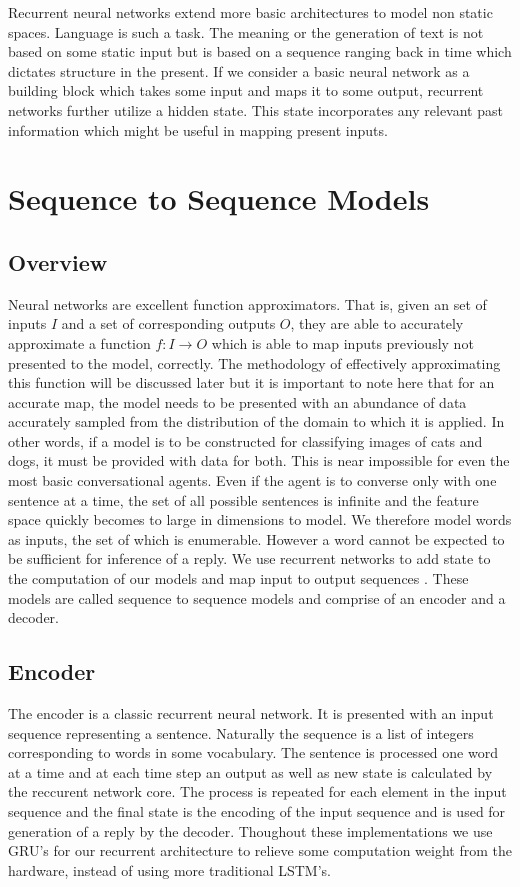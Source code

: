 \documentclass{article}
\begin{document}
    \noindent Recurrent neural networks extend more basic architectures to model non static spaces. Language is such a task. The meaning or the generation of text is not based on some static input but is based on a sequence ranging back in time which dictates structure in the present. If we consider a basic neural network as a building block which takes some input and maps it to some output, recurrent networks further utilize a hidden state. This state incorporates any relevant past information which might be useful in mapping present inputs\cite{rnns}.
    
\section{Sequence to Sequence Models}

\subsection{Overview}
Neural networks are excellent function approximators. That is, given an set of inputs $I$ and a set of corresponding outputs $O$, they are able to accurately approximate a function $f: I \rightarrow O$ which is able to map inputs previously not presented to the model, correctly. The methodology of effectively approximating this function will be discussed later but it is important to note here that for an accurate map, the model needs to be presented with an abundance of data accurately sampled from the distribution of the domain to which it is applied. In other words, if a model is to be constructed for classifying images of cats and dogs, it must be provided with data for both. This is near impossible for even the most basic conversational agents. Even if the agent is to converse only with one sentence at a time, the set of all possible sentences is infinite and the feature space quickly becomes to large in dimensions to model. We therefore model words as inputs, the set of which is enumerable. However a word cannot be expected to be sufficient for inference of a reply. We use recurrent networks to add state to the computation of our models and map input to output sequences \cite{seq}. These models are called sequence to sequence models and comprise of an encoder and a decoder.

\subsection{Encoder}
The encoder is a classic recurrent neural network. It is presented with an input sequence representing a sentence. Naturally the sequence is a list of integers corresponding to words in some vocabulary. The sentence is processed one word at a time and at each time step an output as well as new state is calculated by the reccurent network core. The process is repeated for each element in the input sequence and the final state is the encoding of the input sequence and is used for generation of a reply by the decoder. Thoughout these implementations we use GRU's for our recurrent architecture to relieve some computation weight from the hardware, instead of using more traditional LSTM's.
\end{document}
